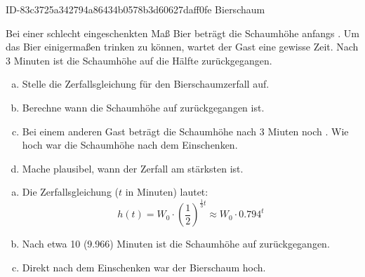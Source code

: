 \begin{exercise}
      {ID-83c3725a342794a86434b0578b3d60627daff0fe}
      {Bierschaum}
  \ifproblem\problem\par
    Bei einer schlecht eingeschenkten Maß Bier beträgt die Schaumhöhe
    anfangs . Um das Bier einigermaßen trinken zu können, wartet
    der Gast eine gewisse Zeit. Nach 3 Minuten ist die Schaumhöhe
    auf die Hälfte zurückgegangen.
    \begin{enumerate}[a)]
      \item Stelle die Zerfallsgleichung für den Bierschaumzerfall auf.
      \item Berechne wann die Schaumhöhe auf  zurückgegangen ist.
      \item Bei einem anderen Gast beträgt die Schaumhöhe nach 3
            Miuten noch . Wie hoch war die Schaumhöhe nach dem
            Einschenken.
      \item Mache plausibel, wann der Zerfall am stärksten ist.
    \end{enumerate}
  \fi
  \ifoutcome\outcome\par
    \begin{enumerate}[a)]
      \item Die Zerfallsgleichung ($t$ in Minuten) lautet:
            \begin{equation*}
              h(t)=W_{0}\cdot\left(\frac{1}{2}\right)^{\frac{1}{3}t}\approx W_{0}\cdot\num{0.794}^{t}
            \end{equation*}
      \item Nach etwa \num{10} (\num{9.966}) Minuten ist die Schaumhöhe auf 
            zurückgegangen.
      \item Direkt nach dem Einschenken war der Bierschaum  hoch.
    \end{enumerate}
  \fi
\end{exercise}
